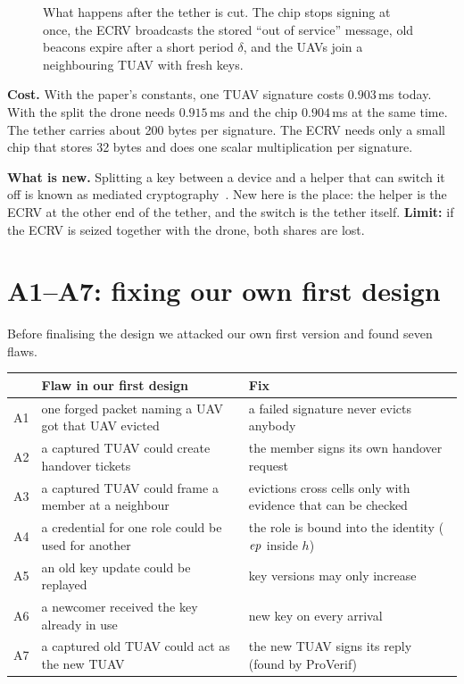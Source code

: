 \documentclass[11pt,openany]{report}
\begin{document}
\begin{figure}[H]
\centering

\caption{What happens after the tether is cut. The chip stops signing at once, the ECRV broadcasts the stored ``out of service'' message, old beacons
expire after a short period $\delta$, and the UAVs join a neighbouring TUAV with fresh keys.}
\label{fig:cut}
\end{figure}

\textbf{Cost.} With the paper's constants, one TUAV signature costs $0.903$\,ms today. With the split the drone needs $0.915$\,ms and the chip
$0.904$\,ms at the same time. The tether carries about 200 bytes per signature. The ECRV needs only a small chip that stores 32 bytes and does one
scalar multiplication per signature.

\textbf{What is new.} Splitting a key between a device and a helper that can switch it off is known as mediated cryptography~\cite{bdtw01,cbn06}. New
here is the place: the helper is the ECRV at the other end of the tether, and the switch is the tether itself. \textbf{Limit:} if the ECRV is seized
together with the drone, both shares are lost.

\section{A1--A7: fixing our own first design}
Before finalising the design we attacked our own first version and found seven flaws.
\begin{center}
\small
\begin{tabularx}{\linewidth}{@{}l X X@{}}
\toprule
& \textbf{Flaw in our first design} & \textbf{Fix}\\
\midrule
A1 & one forged packet naming a UAV got that UAV evicted & a failed signature never evicts anybody\\
A2 & a captured TUAV could create handover tickets & the member signs its own handover request\\
A3 & a captured TUAV could frame a member at a neighbour & evictions cross cells only with evidence that can be checked\\
A4 & a credential for one role could be used for another & the role is bound into the identity ($\mathit{ep}$ inside $h$)\\
A5 & an old key update could be replayed & key versions may only increase\\
A6 & a newcomer received the key already in use & new key on every arrival\\
A7 & a captured old TUAV could act as the new TUAV & the new TUAV signs its reply (found by ProVerif)\\
\bottomrule
\end{tabularx}
\end{center}
\end{document}
